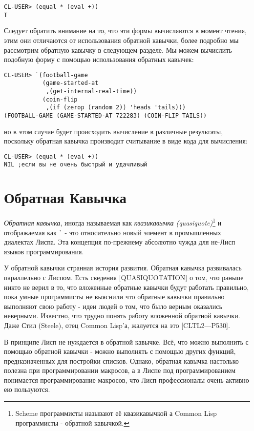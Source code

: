 \begin{verbatim}
CL-USER> (equal * (eval +))
T
\end{verbatim}

Следует обратить внимание на то, что эти формы вычисляются в момент чтения, этим они отличаются от использования обратной кавычки, более подробно мы рассмотрим обратную кавычку в следующем разделе. Мы можем вычислить подобную форму с помощью использования обратных кавычек:

\begin{verbatim}
CL-USER> `(football-game
           (game-started-at
            ,(get-internal-real-time))
           (coin-flip
            ,(if (zerop (random 2)) 'heads 'tails)))
(FOOTBALL-GAME (GAME-STARTED-AT 722283) (COIN-FLIP TAILS))
\end{verbatim}

но в этом случае будет происходить вычисление в различные результаты, поскольку обратная кавычка производит считывание в виде кода для вычисления:

\begin{verbatim}
CL-USER> (equal * (eval +))
NIL ;если вы не очень быстрый и удачливый
\end{verbatim}

\section{Обратная Кавычка}\label{section_backquote}

\emph{Обратная кавычка}, иногда называемая как \emph{квазикавычка (quasiquote)}\footnote{Scheme программисты называют её квазикавычкой а Common Lisp программисты - обратной кавычкой.} и отображаемая как \verb"`" - это относительно новый элемент в промышленных диалектах Лиспа. Эта концепция по-прежнему абсолютно чужда для не-Лисп языков программирования.

У обратной кавычки странная история развития. Обратная кавычка развивалась параллельно с Лиспом. Есть сведения [QUASIQUOTATION] о том, что раньше никто не верил в то, что вложенные обратные кавычки будут работать правильно, пока умные программисты не выяснили что обратные кавычки правильно выполняют свою работу - идеи людей о том, что было верным оказались неверными. Известно, что трудно понять работу вложенной обратной кавычки. Даже Стил (Steele), отец Common Lisp'а, жалуется на это [CLTL2—P530].

В принципе Лисп не нуждается в обратной кавычке. Всё, что можно выполнить с помощью обратной кавычки - можно выполнять с помощью других функций, предназначенных для постройки списков. Однако, обратная кавычка настолько полезна при программировании макросов, а в Лиспе под программированием понимается программирование макросов, что Лисп профессионалы очень активно ею пользуются.

